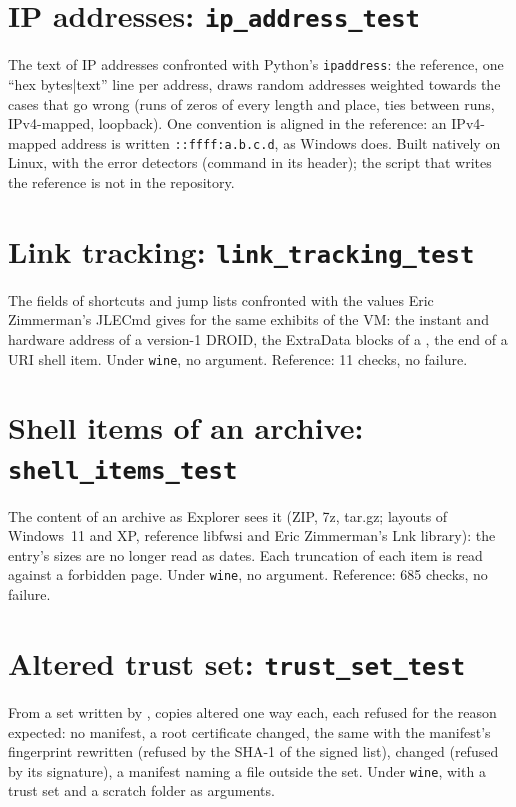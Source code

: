 \documentclass[11pt,a4paper,oneside]{report}
\begin{document}
\section{IP addresses: \texttt{ip\_address\_test}}

The text of IP addresses confronted with Python's \texttt{ipaddress}: the
reference, one ``hex bytes|text'' line per address, draws random addresses
weighted towards the cases that go wrong (runs of zeros of every length and
place, ties between runs, IPv4-mapped, loopback). One convention is aligned in
the reference: an IPv4-mapped address is written \texttt{::ffff:a.b.c.d}, as
Windows does. Built natively on Linux, with the error detectors (command in its
header); the script that writes the reference is not in the repository.

\section{Link tracking: \texttt{link\_tracking\_test}}

The fields of shortcuts and jump lists confronted with the values Eric
Zimmerman's JLECmd gives for the same exhibits of the VM: the instant and
hardware address of a version-1 DROID, the ExtraData blocks of a ,
the end of a URI shell item. Under \texttt{wine}, no argument. Reference:
11 checks, no failure.

\section{Shell items of an archive: \texttt{shell\_items\_test}}

The content of an archive as Explorer sees it (ZIP, 7z, tar.gz; layouts of
Windows~11 and XP, reference libfwsi and Eric Zimmerman's Lnk library): the
entry's sizes are no longer read as dates. Each truncation of each item is read
against a forbidden page. Under \texttt{wine}, no argument. Reference:
685 checks, no failure.

\section{Altered trust set: \texttt{trust\_set\_test}}

From a set written by , copies altered one way each, each
refused for the reason expected: no manifest, a root certificate changed, the
same with the manifest's fingerprint rewritten (refused by the SHA-1 of the
signed list),  changed (refused by its signature), a
manifest naming a file outside the set. Under \texttt{wine}, with a trust set
and a scratch folder as arguments.
\end{document}
